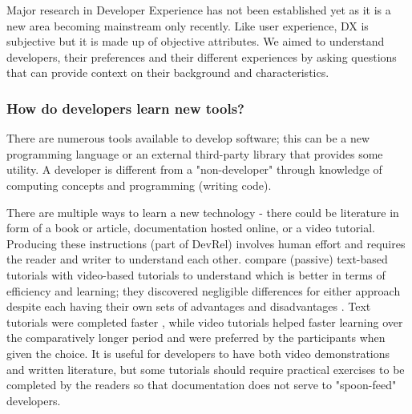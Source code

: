 \documentclass[../mpaper.tex]{subfiles}
\begin{document}
Major research in Developer Experience has not been established yet as it is a new area becoming mainstream only recently. Like user experience, DX is subjective but it is made up of objective attributes. We aimed to understand developers, their preferences and their different experiences by asking questions that can provide context on their background and characteristics.


\subsubsection*{How do developers learn new tools?}

There are numerous tools available to develop software; this can be a new programming language or an external third-party library that provides some utility. A developer is different from a "non-developer" through knowledge of computing concepts and programming (writing code).

There are multiple ways to learn a new technology - there could be literature in form of a book or article, documentation hosted online, or a video tutorial. Producing these instructions (part of DevRel) involves human effort and requires the reader and writer to understand each other. \citet{kafer2017best} compare (passive) text-based tutorials with video-based tutorials to understand which is better in terms of efficiency and learning; they discovered negligible differences for either approach despite each having their own sets of advantages and disadvantages  \cite{alexanderUsabilityPrintOnline2013}. Text tutorials were completed faster \cite{mestreStudentPreferenceTutorial2012}, while video tutorials helped faster learning over the comparatively longer period \cite{lloydScreencastTutorialsEnhance2012,vandermeijComparisonPaperbasedVideo2014} and were preferred by the participants when given the choice. It is useful for developers to have both video demonstrations and written literature, but some tutorials should require practical exercises to be completed by the readers so that documentation does not serve to "spoon-feed" developers.
\end{document}
